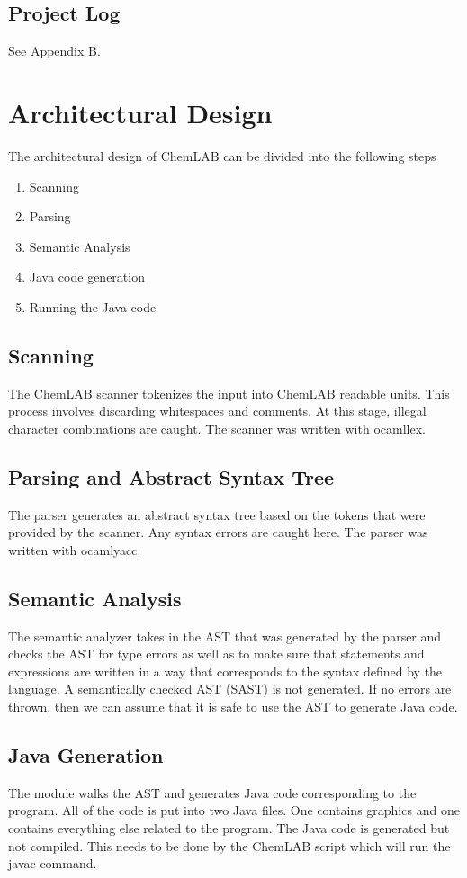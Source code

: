 \documentclass[11pt]{report}
\begin{document}
\section{Project Log}
See Appendix B.

\chapter{Architectural Design}
The architectural design of ChemLAB can be divided into the following steps
\begin{enumerate}
	\item Scanning
	\item Parsing
	\item Semantic Analysis
	\item Java code generation
	\item Running the Java code
\end{enumerate}

\section{Scanning}
The ChemLAB scanner tokenizes the input into ChemLAB readable units. This process involves discarding whitespaces and comments. At this stage, illegal character combinations are caught. The scanner was written with ocamllex. 

\section{Parsing and Abstract Syntax Tree}
The parser generates an abstract syntax tree based on the tokens that were provided by the scanner. Any syntax errors are caught here. The parser was written with ocamlyacc. 

\section{Semantic Analysis}
The semantic analyzer takes in the AST that was generated by the parser and checks the AST for type errors as well as to make sure that statements and expressions are written in a way that corresponds to the syntax defined by the language. A semantically checked AST (SAST) is not generated. If no errors are thrown, then we can assume that it is safe to use the AST to generate Java code. 

\section{Java Generation}
The module walks the AST and generates Java code corresponding to the program. All of the code is put into two Java files. One contains graphics and one contains everything else related to the program. The Java code is generated but not compiled. This needs to be done by the ChemLAB script which will run the javac command. 
\end{document}
